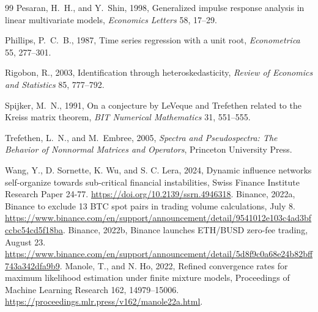 \documentclass[12pt]{article}
\theoremstyle{definition}
\theoremstyle{remark}
\begin{document}
\begin{thebibliography}{99}
Pesaran, H.~H., and Y.~Shin, 1998, Generalized impulse response analysis in linear multivariate models, \emph{Economics Letters} 58, 17--29.

Phillips, P.~C.~B., 1987, Time series regression with a unit root, \emph{Econometrica} 55, 277--301.

Rigobon, R., 2003, Identification through heteroskedasticity, \emph{Review of Economics and Statistics} 85, 777--792.

Spijker, M.~N., 1991, On a conjecture by LeVeque and Trefethen related to the Kreiss matrix theorem, \emph{BIT Numerical Mathematics} 31, 551--555.

Trefethen, L.~N., and M.~Embree, 2005, \emph{Spectra and Pseudospectra: The Behavior of Nonnormal Matrices and Operators}, Princeton University Press.


 Wang, Y., D. Sornette, K. Wu, and S. C. Lera, 2024, Dynamic influence networks self-organize towards sub-critical financial instabilities, Swiss Finance Institute Research Paper 24-77. \url{https://doi.org/10.2139/ssrn.4946318}.
 Binance, 2022a, Binance to exclude 13 BTC spot pairs in trading volume calculations, July 8. \url{https://www.binance.com/en/support/announcement/detail/9541012e103c4ad3bfccbc54cd5f18ba}.
 Binance, 2022b, Binance launches ETH/BUSD zero-fee trading, August 23. \url{https://www.binance.com/en/support/announcement/detail/5d8f9c0a68e24b82bff743a342dfa9b9}.
 Manole, T., and N. Ho, 2022, Refined convergence rates for maximum likelihood estimation under finite mixture models, Proceedings of Machine Learning Research 162, 14979--15006. \url{https://proceedings.mlr.press/v162/manole22a.html}.
\end{thebibliography}
\end{document}
